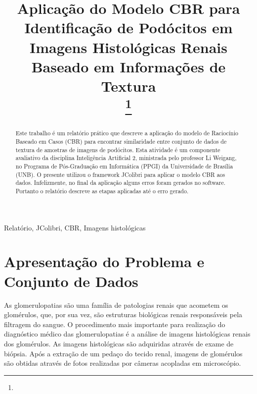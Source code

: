 \documentclass[conference]{IEEEtran}
\begin{document}
\title{Aplicação do Modelo CBR para Identificação de Podócitos em Imagens Histológicas Renais Baseado em Informações de Textura\\
	\thanks{}
}

\author{
}

\maketitle

\begin{abstract}
Este trabalho é um relatório prático que descreve a aplicação do modelo de Raciocínio Baseado em Casos (CBR) para encontrar similaridade entre conjunto de dados de textura de amostras de imagens de podócitos. Esta atividade é um componente avaliativo da disciplina Inteligência Artificial 2, ministrada pelo professor Li Weigang, no Programa de Pós-Graduação em Informática (PPGI) da Universidade de Brasília (UNB). O presente utilizou o framework JColibri para aplicar o modelo CBR aos dados. Infelizmente, no final da aplicação alguns erros foram gerados no software. Portanto o relatório descreve as etapas aplicadas até o erro gerado. 
\end{abstract}

\begin{IEEEkeywords}
Relatório, JColibri, CBR, Imagens histológicas
\end{IEEEkeywords}

\section{Apresentação do Problema e Conjunto de Dados}
As glomerulopatias são uma família de patologias renais que acometem os glomérulos, que, por sua vez, são estruturas biológicas renais responsáveis pela filtragem do sangue. O procedimento mais importante para realização do diagnóstico médico das glomerulopatias é a análise de imagens histológicas renais dos glomérulos. As imagens histológicas são adquiridas através de exame de biópsia. Após a extração de um pedaço do tecido renal, imagens de glomérulos são obtidas através de fotos realizadas por câmeras acopladas em microscópio. 
\end{document}
